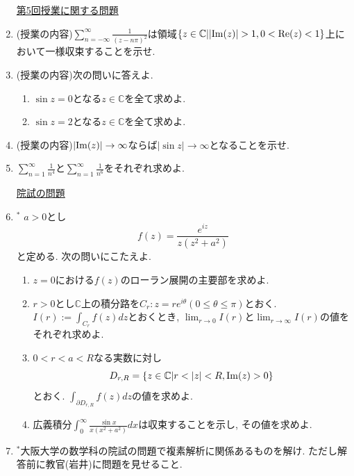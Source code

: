 \documentclass[dvipdfmx,a4paper,11pt]{article}
\newcommand{\C}{\mathbb{C}}
\theoremstyle{definition}
\begin{document}
\begin{enumerate}[label=\textbf{問}4.\arabic*]
      
 \vspace{12pt}
\hspace{-36pt}\underline{第5回授業に関する問題}     
  \item (授業の内容)$\sum_{n= - \infty}^{\infty} \frac{1}{(z - n \pi)^2}$は領域$\{ z \in \C | |{\rm Im}(z)| >1, 0 < {\rm Re}(z) < 1\}$上において一様収束することを示せ.

 \item  (授業の内容)次の問いに答えよ.
  \begin{enumerate}
\setlength{\parskip}{0cm} 
  \setlength{\itemsep}{0cm} 
\item $\sin z =0$となる$z \in \C$を全て求めよ. 
\item $\sin z =2$となる$z \in \C$を全て求めよ. 
   \end{enumerate}
   
 \item  (授業の内容)$|{ \rm Im}(z)| \rightarrow \infty$ならば$|\sin z| \rightarrow \infty$となることを示せ.
 
 
\item $\sum_{n=1}^{\infty}\frac{1}{n^4}$と$\sum_{n=1}^{\infty}\frac{1}{n^6}$をそれぞれ求めよ. 

   
 
\vspace{12pt}
\hspace{-36pt}\underline{院試の問題}  
  \item $^{*}$ $a>0$とし
  $$
  f(z) = \frac{ e^{iz}}{z(z^2 + a^2)}
  $$
  と定める. 次の問いにこたえよ.
   \begin{enumerate}
 \setlength{\parskip}{0cm} 
  \setlength{\itemsep}{0cm} 
  \item $z=0$における$f(z)$のローラン展開の主要部を求めよ.
  \item $r>0$とし$\C$上の積分路を$C_{r} : z = r e^{i \theta} (0 \le \theta \le \pi)$とおく. 
  $I(r) := \int_{C_r} f(z )dz$とおくとき, $\lim_{r \rightarrow 0} I(r)$と$\lim_{r \rightarrow \infty} I(r)$の値をそれぞれ求めよ.
  \item $0 < r < a < R$なる実数に対し
  $$
  D_{r,R}= \{ z \in \C | r < |z| < R, {\rm Im}(z) >0 \}
  $$
  とおく. $\int_{\partial D_{r,R}} f(z) dz$の値を求めよ.
  \item 広義積分$\int_{0}^{\infty}\frac{ \sin x}{x(x^2 + a^2)} dx$は収束することを示し, その値を求めよ.
      \end{enumerate}
     
\item $^{*}$大阪大学の数学科の院試の問題で複素解析に関係あるものを解け. ただし解答前に教官(岩井)に問題を見せること. 

    \end{enumerate}      
 
\end{document}
